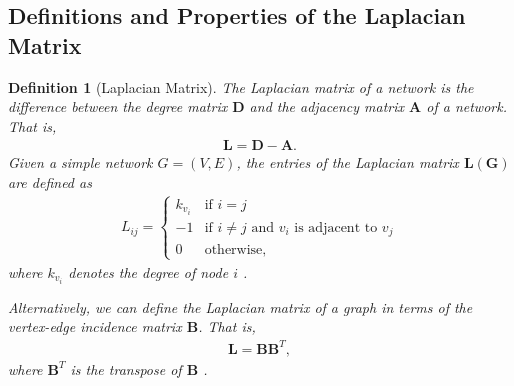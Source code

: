 \documentclass[10pt,a4paper]{article}
\newtheorem{defn}{Definition}
\begin{document}
\subsection{Definitions and Properties of the Laplacian Matrix}

\begin{defn}[Laplacian Matrix]
	The Laplacian matrix of a network is the difference between the degree matrix $\mathbf{D}$ and the adjacency matrix $\mathbf{A}$ of a network. That is,
	\begin{eqnarray}
	\mathbf{L} = \mathbf{D} - \mathbf{A}.
	\end{eqnarray}
	Given a simple network $G=(V,E)$, the entries of the Laplacian matrix $\mathbf{L(G)}$  are defined as
	\begin{eqnarray}
	L_{ij} = \begin{cases} k_{v_i} &\mbox{if } i = j \\
	-1 &\mbox{if } i \neq j \text{ and } v_i \text{ is adjacent to } v_j \\
	0 & \text{otherwise},
	\end{cases}
	\end{eqnarray}
	where $k_{v_i}$  denotes the degree of node $i$ \citep{estrada2011structure}.
	
	Alternatively, we can define the Laplacian matrix of a graph in terms of the vertex-edge incidence matrix $\mathbf{B}$. That is,
	\begin{eqnarray}
	\mathbf{L} =  \mathbf{B} \mathbf{B}^T,
	\label{lintermsb}
	\end{eqnarray}
	where $\mathbf{B}^T$ is the transpose of $\mathbf{B}$ \citep{estrada2011structure}.
\end{defn}

\end{document}
